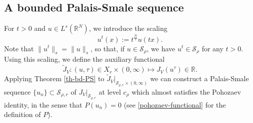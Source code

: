 \documentclass[11pt,reqno]{amsart}
\theoremstyle{definition}
\numberwithin{equation}{section}
\numberwithin{theorem}{section}
\numberwithin{equation}{section}
\numberwithin{theorem}{section}
\newcommand{\R}{\mathbb{R}}
\begin{document}
\subsection{A bounded Palais-Smale sequence}
For $t>0$ and $u\in L^s(\R^N)$, we introduce the scaling 
$$u^t(x):=t^{\frac{N}{s}}u(tx).$$
Note that $\|u^t\|_s=\|u\|_s$, so that, if $u\in\mathcal{S}_\rho$, we have $u^t\in\mathcal{S}_\rho$ for any $t>0$. Using this scaling, we define the auxiliary functional
$$\tilde{J}_V:(u,\tau)\in X_r\times(0,\infty)\mapsto J_V(u^\tau)\in\R.$$
Applying Theorem \ref{th-bd-PS} to $\tilde{J}_V|_{\mathcal{S}_{\rho,r}\times(0,\infty)}$ we can construct a Palais-Smale sequence $\{u_n\}\subset \mathcal{S}_{\rho,r}$ of $J_V|_{\mathcal{S}_{\rho,r}}$ at level $c_{\rho}$ which almost satisfies the Pohozaev identity, in the sense that $P(u_n)=0$ (see \eqref{pohozaev-functional} for the definition of $P$).\\
\end{document}
